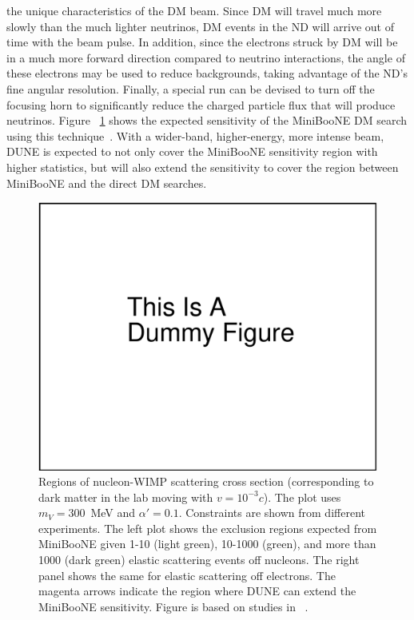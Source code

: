 the unique characteristics of the DM beam. Since DM will travel much
more slowly than the much lighter neutrinos, %
DM events in the ND will arrive out of time with the %
beam pulse.
%
In addition, since the electrons struck by DM will be in a much more
forward direction compared to neutrino interactions, the angle of
these electrons may be used to reduce backgrounds, taking advantage of
the ND's fine angular resolution. %
Finally, a special run can be devised to turn off the focusing horn to
significantly reduce the charged particle flux that will produce
neutrinos.  
Figure ~\ref{fig:wimp} shows the expected sensitivity of the MiniBooNE
DM search using this technique~\cite{Dharmapalan:2012xp}. With a
wider-band, higher-energy, more intense beam, DUNE is expected to not
only cover the MiniBooNE sensitivity region with higher statistics,
but will also extend the sensitivity to cover the region between 
MiniBooNE and the direct DM searches.
\begin{figure}[!tb]
\centerline{
\includegraphics[width=\textwidth]{graphics/dummy.pdf}
}
\caption[Regions of nucleon-WIMP cross section versus WIMP
mass]{Regions of nucleon-WIMP scattering cross section (corresponding
  to dark matter in the lab moving with $v = 10^{-3}c$). The plot uses
  $m_V = 300$~MeV and $\alpha'=0.1$. Constraints are shown from
  different experiments.  The left plot shows the exclusion regions
  expected from MiniBooNE given 1-10 (light green), 10-1000 (green),
  and more than 1000 (dark green) elastic scattering events off
  nucleons. The right panel shows the same for elastic scattering off
  electrons. The magenta arrows indicate the region where DUNE can
  extend the MiniBooNE sensitivity. Figure is based on studies in ~\cite{Dharmapalan:2012xp}.}
\label{fig:wimp}
\end{figure}
